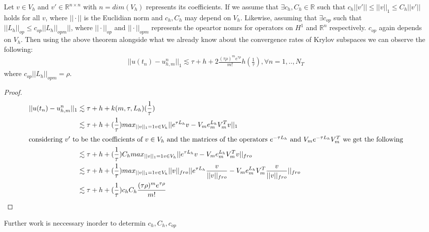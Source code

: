 \begin{corollary}
    Let $v\in V_h$ and $v'\in \mathbb{R}^{n\times n}$ with $n = dim(V_h)$ represents its coefficients.
    If we assume that $\exists c_h,C_h \in \mathbb{R}$ such that $c_h||v'|| \leq ||v||_1 \leq C_h||v'||$ holds for all $v$, where $||\cdot||$ is the Euclidian norm and $c_h,C_h$ may depend on $V_h$.
    Likewise, assuming that $\exists c_{op}$ such that $||L_h||_{op} \leq c_{op} ||L_h||_{opm}||$, where $||\cdot||_{op}$ and $||\cdot||_{opm}$ represents the opeartor nomrs for operators on $H^1$ and $\mathbb{R}^n$ respectively.
    $c_{op}$ again depends on $V_h$.
    Then using the above theorem alongside what we already know about the convergence rates of Krylov subspaces we can observe the following:
    \begin{align*}
        ||u(t_n) - u_{h,m}^n||_1 \lesssim \tau + h + 2 \frac{(\tau \rho)^m e^{\tau \rho}}{m!}h(\frac{1}{\tau}), \forall n = 1,..,N_T
    \end{align*}
    where $c_{op}||L_h||_{opm} = \rho$.
\end{corollary}
\begin{proof}
    \begin{align*}
        ||u(t_n) - u_{h,m}^n||_1 &\lesssim \tau + h + k(m,\tau, L_h)(\frac{1}{\tau})\\
        &\lesssim \tau + h + (\frac{1}{\tau})max_{||v||_1=1 v\in V_h}||e^{\tau L_h}v - V_m e_m^{L_h}V^T_mv||_1 \\
        \intertext{considering $v'$ to be the coefficients of $v\in V_h$ and the matrices of the operators $e^{-\tau L_h}$ and $V_m e^{-\tau L_h} V^T_m$ we get the following}
        &\lesssim \tau + h + (\frac{1}{\tau})C_hmax_{||v||_1=1 v\in V_h}||e^{\tau L_h}v - V_m e_m^{L_h}V^T_mv||_{fro}\\
        &\lesssim \tau + h + (\frac{1}{\tau})max_{||v||_1=1 v\in V_h}||v||_{fro}||e^{\tau L_h}\frac{v}{||v||_{fro}} - V_m e_m^{L_h}V^T_m\frac{v}{||v||_{fro}}||_{fro}\\
        &\lesssim \tau + h + (\frac{1}{\tau})c_h C_h\frac{(\tau \rho)^m e^{\tau \rho}}{m!}
    \end{align*}
\end{proof}

Further work is neccessary inorder to determin $c_h,C_h,c_{op}$
